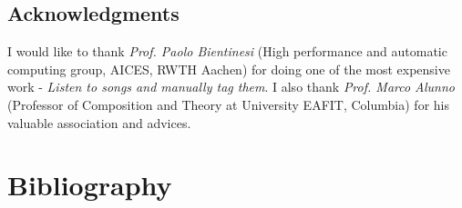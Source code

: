 \documentclass{book}
\begin{document}
\vspace{5cm}


\newpage

\section*{\bf Acknowledgments}
I would like to thank \textit{Prof. Paolo Bientinesi} (High performance and automatic computing group, AICES, RWTH Aachen) for doing one of the most expensive work - \textit{Listen to songs and manually tag them}. I also thank  \textit{Prof. Marco Alunno} (Professor of Composition and Theory at University EAFIT, Columbia) for his valuable association and advices.  
\tableofcontents


 





%
%
%
%
%
%


 
\printglossaries
\chapter*{Bibliography}
\printbibliography[type={inproceedings},title={Proceedings},heading=subbibliography]
\printbibliography[type={article},title={Articles},heading=subbibliography]
\printbibliography[keyword={preprint},title={Pre-Prints},heading=subbibliography]
\printbibliography[type={book},title={Books},heading=subbibliography]
\printbibliography[type={misc},title={Misc},heading=subbibliography]
\end{document}
